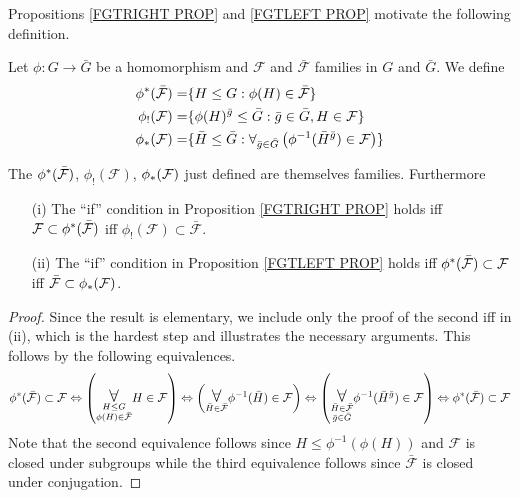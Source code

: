 \documentclass[a4paper,10pt]{article}%
\begin{document}
Propositions \ref{FGTRIGHT PROP} and \ref{FGTLEFT PROP}
motivate the following definition.

\begin{definition}
  Let $\phi \colon G \to \bar{G}$ be a homomorphism and $\mathcal{F}$ and $\bar{\mathcal{F}}$ families in $G$
  and $\bar{G}$. We define
  \begin{align}\label{PHISTARDEF EQ}
    \phi^{\**}(\bar{\mathcal{F}})
    =&
    \{H \leq G : \phi(H) \in \bar{\mathcal{F}}\}
    \\
    \phi_!(\mathcal{F})
    =&
    \{\phi(H)^{\bar{g}}\leq \bar{G} : \bar{g} \in \bar{G}, H \in \mathcal{F}\}
    \\ \label{PHISTARDEF3 EQ}
    \phi_{\**}(\mathcal{F})
    =&
    \{\bar{H} \leq \bar{G} : 
    \forall_{\bar{g} \in \bar{G}} 
    \left(
      \phi^{-1}(\bar{H}^{\bar{g}}) \in \mathcal{F}
    \right)\}
  \end{align}
\end{definition}

\begin{lemma}
  The $\phi^{\**}(\bar{\mathcal{F}})$, $\phi_{!}(\mathcal{F})$, $\phi_{\**}(\mathcal{F})$ just defined are 
  themselves families. Furthermore
  \begin{itemize}
  \item[(i)] The ``if'' condition in Proposition \ref{FGTRIGHT PROP} holds iff 
    $\mathcal{F} \subset \phi^{\**} (\bar{\mathcal{F}})$
    iff
    $\phi_{!}(\mathcal{F}) \subset \bar{\mathcal{F}}$.
  \item [(ii)]
    The ``if'' condition in Proposition \ref{FGTLEFT PROP} holds iff 
    $\phi^{\**} (\bar{\mathcal{F}}) \subset \mathcal{F}$
    iff
    $\bar{\mathcal{F}} \subset \phi_{\**}(\mathcal{F})$.
  \end{itemize}
\end{lemma}


\begin{proof}
  Since the result is elementary, we include only the proof of the second iff in (ii), which is the hardest step and illustrates the necessary arguments. This follows by the following equivalences.
  \[
  \phi^{\**} (\bar{\mathcal{F}}) \subset \mathcal{F}
  \Leftrightarrow
  \left( \underset{ \substack{H \leq G \\ \phi(H) \in \bar{\mathcal{F}} }}{\mathlarger{\mathlarger{\forall}}} 
    H \in \mathcal{F} \right)
  \Leftrightarrow
  \left( \underset{\bar{H} \in \bar{\mathcal{F}}}{\mathlarger{\mathlarger{\forall}}}
    \phi^{-1}(\bar{H}) \in \mathcal{F}
  \right)
  \Leftrightarrow
  \left( \underset{ \substack{\bar{H} \in \bar{\mathcal{F}}\\\bar{g} \in \bar{G}}}{\mathlarger{\mathlarger{\forall}}}
    \phi^{-1}(\bar{H}^{\bar{g}}) \in \mathcal{F}
  \right)
  \Leftrightarrow
  \phi^{\**} (\bar{\mathcal{F}}) \subset \mathcal{F}
  \]
  Note that the second equivalence follows since 
  $H \leq \phi^{-1}(\phi(H))$ and $\mathcal{F}$ is closed under subgroups while the third equivalence follows since 
  $\bar{\mathcal{F}}$ is closed under conjugation. 
\end{proof}
\end{document}

